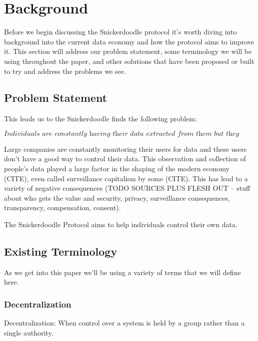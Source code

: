 \section{Background}
Before we begin discussing the Snickerdoodle protocol it's worth diving into background into the current data economy and how the protocol aims to improve it. This section will address our problem statement, some terminology we will be using throughout the paper, and other solutions that have been proposed or built to try and address the problems we see.

\subsection{Problem Statement}


This leads us to the Snickerdoodle finds the following problem:

$$\textit{Individuals are constantly having their data extracted from them but they don't own that data}$$

Large companies are constantly monitoring their users for data and these users don't have a good way to control their data. This observation and collection of people's data played a large factor in the shaping of the modern economy (CITE), even called surveillance capitalism by some (CITE). This has lead to a variety of negative consequences (TODO SOURCES PLUS FLESH OUT -- stuff about who gets the value and security, privacy, surveillance consequences, transparency, compensation, consent). 

The Snickerdoodle Protocol aims to help individuals control their own data.


\subsection{Existing Terminology}
As we get into this paper we'll be using a variety of terms that we will define here.
\subsubsection{Decentralization}
\begin{definition}
\label{definition:Decentralization}
Decentralization: When control over a system is held by a group rather than a single authority.
\end{definition}

